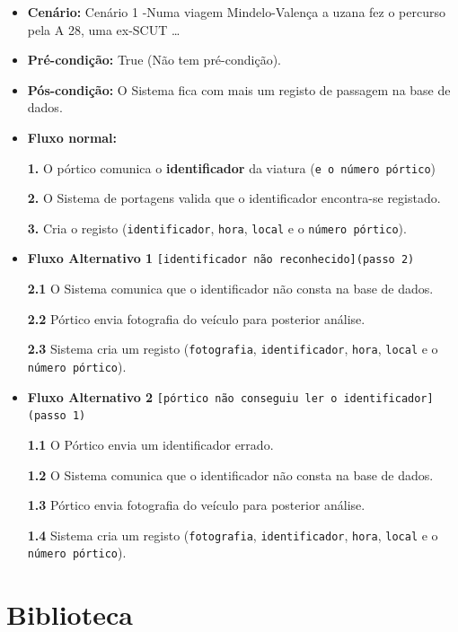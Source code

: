 \documentclass[11pt]{article}
\begin{document}
\begin{itemize}
\item \textbf{Cenário:}
Cenário 1 -Numa viagem Mindelo-Valença a uzana fez o percurso pela A 28, uma ex-SCUT \ldots{}

\item \textbf{Pré-condição:}
True (Não tem pré-condição).

\item \textbf{Pós-condição:}
O Sistema fica com mais um registo de passagem na  base de dados.

\item \textbf{Fluxo normal:}

\textbf{1.} O pórtico comunica o \textbf{identificador} da viatura (\texttt{e o número pórtico})

\textbf{2.} O Sistema de portagens valida que o identificador encontra-se registado.

\textbf{3.} Cria o registo (\texttt{identificador}, \texttt{hora}, \texttt{local} e o \texttt{número pórtico}).

\item \textbf{Fluxo Alternativo 1} \texttt{[identificador não reconhecido](passo 2)}

\textbf{2.1} O Sistema comunica que o identificador não consta na base de dados.

\textbf{2.2} Pórtico envia fotografia do veículo para posterior análise.

\textbf{2.3} Sistema cria um registo (\texttt{fotografia}, \texttt{identificador}, \texttt{hora}, \texttt{local} e o \texttt{número pórtico}).

\item \textbf{Fluxo Alternativo 2} \texttt{[pórtico não conseguiu ler o identificador](passo 1)}

\textbf{1.1} O Pórtico envia um identificador errado.

\textbf{1.2} O Sistema comunica que o identificador não consta na base de dados.

\textbf{1.3} Pórtico envia fotografia do veículo para posterior análise.

\textbf{1.4} Sistema cria um registo (\texttt{fotografia}, \texttt{identificador}, \texttt{hora}, \texttt{local} e o \texttt{número pórtico}).
\end{itemize}

\section{Biblioteca}
\label{sec:org3630c35}
\end{document}
